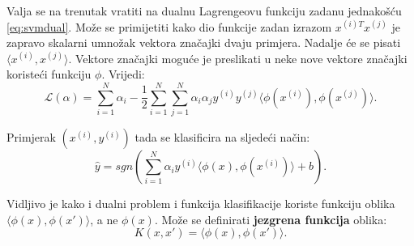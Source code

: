 \documentclass[times, utf8, zavrsni, numeric]{fer}
\begin{document}
\par Valja se na trenutak vratiti na dualnu Lagrengeovu funkciju zadanu jednakošću \ref{eq:svmdual}.
Može se primijetiti kako dio funkcije zadan izrazom $x^{(i)T}x^{(j)}$ je zapravo skalarni umnožak vektora
značajki dvaju primjera. Nadalje će se pisati $\langle x^{(i)},x^{(j)} \rangle$. 
Vektore značajki moguće je preslikati u neke nove vektore značajki koristeći funkciju $\phi$. 
Vrijedi:
\begin{equation*}
  \mathcal{L}(\alpha) = \sum_{i=1}^{N} \alpha_i - 
  \frac{1}{2}\sum_{i=1}^{N}\sum_{j=1}^{N} \alpha_i\alpha_jy^{(i)}y^{(j)}
  \langle \phi(x^{(i)}), \phi(x^{(j)}) \rangle.
\end{equation*}

Primjerak $(x^{(i)}, y^{(i)})$ tada se klasificira na sljedeći način:
\begin{equation*}
  \hat{y} = sgn(\sum_{i=1}^{N} \alpha_iy^{(i)}\langle \phi(x), \phi(x^{(i)}) \rangle
  + b).
\end{equation*}

Vidljivo je kako i dualni problem i funkcija klasifikacije koriste funkciju oblika
$\langle \phi(x), \phi(x') \rangle$, a ne $\phi(x)$. 
Može se definirati \textbf{jezgrena funkcija} oblika:
\begin{equation} \label{eq:trik}
  K(x, x') = \langle \phi(x), \phi(x') \rangle.
\end{equation}
\end{document}
